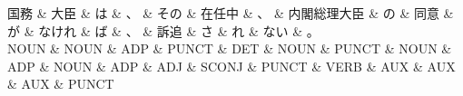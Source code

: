 \documentclass[tikz,border=5pt]{standalone}
\begin{document}
\normalsize
\begin{dependency}[edge unit distance=12.0pt]
    \begin{deptext}[column sep=1em]
        国務 \& 大臣 \& は \& 、 \& その \& 在任中 \& 、 \& 内閣総理大臣 \& の \& 同意 \& が \& なけれ \& ば \& 、 \& 訴追 \& さ \& れ \& ない \& 。\\
        NOUN \& NOUN \& ADP \& PUNCT \& DET \& NOUN \& PUNCT \& NOUN \& ADP \& NOUN \& ADP \& ADJ \& SCONJ \& PUNCT \& VERB \& AUX \& AUX \& AUX \& PUNCT\\
    \end{deptext}
\end{dependency}
\end{document}
